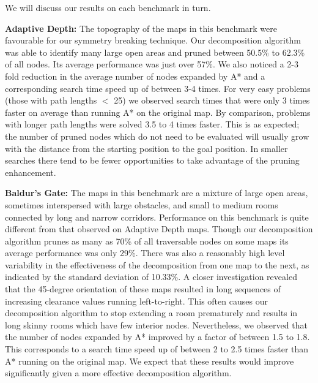 We will discuss our results on each benchmark in turn.

\textbf{Adaptive Depth:} 
The topography of the maps in this benchmark were favourable for our
symmetry breaking technique.
Our decomposition algorithm was able to identify many large open areas and
pruned between 50.5\% to 62.3\% of all nodes.
Its average performance was just over 57\%. 
We also noticed a 2-3 fold reduction in the average number of nodes expanded 
by A* and a corresponding search time speed up of between 3-4 times.
For very easy problems (those with path lengths $<$ 25) we observed search times 
that were only 3 times faster on average than running A* on the original map. 
By comparison, problems with longer path lengths were solved 3.5 to 4 times faster.
This is as expected; the number of pruned nodes which do not need to be evaluated
will usually grow with the distance from the starting position to the goal
position. In smaller searches there tend to be fewer opportunities to take advantage 
of the pruning enhancement.
%
\par
\textbf{Baldur's Gate: }
The maps in this benchmark are a mixture of large open areas, sometimes
interspersed with large obstacles, and small to medium rooms connected
by long and narrow corridors.
Performance on this benchmark is quite different from that observed on Adaptive Depth maps.
Though our decomposition algorithm prunes as many as 70\% of all traversable nodes 
on some maps its average performance was only 29\%. 
There was also a reasonably high level variability in the effectiveness of the 
decomposition from one map to the next, as indicated by the standard deviation
of 10.33\%.
A closer investigation revealed that the 45-degree orientation of these maps
resulted in long sequences of increasing clearance values running left-to-right.
This often causes our decomposition algorithm to stop extending a room
prematurely and results in long skinny rooms which have few interior nodes.
Nevertheless, we observed that the number of nodes expanded by A* improved by a
factor of between 1.5 to 1.8. This corresponds to a search time speed up of between
2 to 2.5 times faster than A* running on the original map.
We expect that these results would improve significantly given a more effective
decomposition algorithm.
